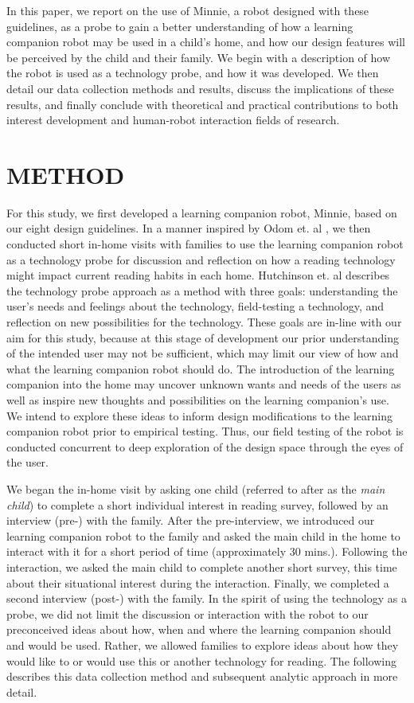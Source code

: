 \documentclass{sigchi}
\begin{document}
In this paper, we report on the use of Minnie, a robot designed with these guidelines, as a probe to gain a better understanding of how a learning companion robot may be used in a child's home, and how our design features will be perceived by the child and their family. We begin with a description of how the robot is used as a technology probe, and how it was developed. We then detail our data collection methods and results, discuss the implications of these results, and finally conclude with theoretical and practical contributions to both interest development and human-robot interaction fields of research.


\section{METHOD}
 For this study, we first developed a learning companion robot, Minnie, based on our eight design guidelines. In a manner inspired by Odom et. al \cite{Odom:2012}, we then conducted short in-home visits with families to use the learning companion robot as a technology probe \cite{Hutchinson:2003} for discussion and reflection on how a reading technology might impact current reading habits in each home. Hutchinson et. al \cite{Hutchinson:2003} describes the technology probe approach as a method with three goals: understanding the user's needs and feelings about the technology, field-testing a technology, and reflection on new possibilities for the technology. These goals are in-line with our aim for this study, because at this stage of development our prior understanding of the intended user may not be sufficient, which may limit our view of how and what the learning companion robot should do. The introduction of the learning companion into the home may uncover unknown wants and needs of the users as well as inspire new thoughts and possibilities on the learning companion's use. We intend to explore these ideas to inform design modifications to the learning companion robot prior to empirical testing. Thus, our field testing of the robot is conducted concurrent to deep exploration of the design space through the eyes of the user.
 
 We began the in-home visit by asking one child (referred to after as the \textit{main child}) to complete a short individual interest in reading survey, followed by an interview (pre-) with the family. After the pre-interview, we introduced our learning companion robot to the family and asked the main child in the home to interact with it for a short period of time (approximately 30 mins.). Following the interaction, we asked the main child to complete another short survey, this time about their situational interest during the interaction. Finally, we completed a second interview (post-) with the family. In the spirit of using the technology as a probe, we did not limit the discussion or interaction with the robot to our preconceived ideas about how, when and where the learning companion should and would be used. Rather, we allowed families to explore ideas about how they would like to or would use this or another technology for reading. The following describes this data collection method and subsequent analytic approach in more detail.
 
\end{document}
